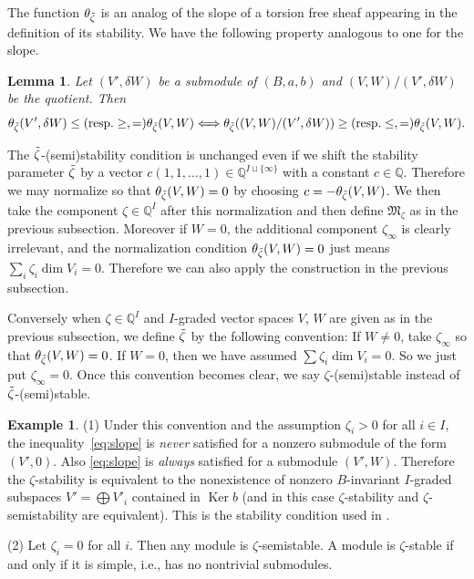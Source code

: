 \documentclass[10pt,a4paper]{amsart}
\newtheorem{Lemma}[equation]{Lemma}
\theoremstyle{definition}
\newtheorem{Example}[equation]{Example}
\numberwithin{equation}{section}
\newcommand{\Q}{{\mathbb Q}}
\newcommand{\Ker}{\operatorname{Ker}}
\newcommand{\M}{{\mathfrak M}} %
\begin{document}
The function $\theta_{\Tilde\zeta}$ is an analog of the slope of a
torsion free sheaf appearing in the def\/inition of its stability. We
have the following property analogous to one for the slope.
\begin{Lemma}\label{lem:slope}
  Let $(V',\delta W)$ be a submodule of $(B,a,b)$ and
  $(V,W)/(V',\delta W)$ be the quotient. Then
  \begin{equation*}
     \theta_{\Tilde\zeta}(V',\delta W)
     \le (\text{resp.} \ge, =)
     \theta_{\Tilde\zeta}(V,W)
     \Longleftrightarrow
     \theta_{\Tilde\zeta}((V,W)/(V',\delta W))
     \ge (\text{resp.} \le, =)
     \theta_{\Tilde\zeta}(V,W).
  \end{equation*}
\end{Lemma}


The $\Tilde\zeta$-(semi)stability condition is unchanged even if we
shift the stability parameter $\Tilde\zeta$ by a vector
$c(1,1,\dots,1)\in \Q^{I\sqcup\{\infty\}}$ with a constant $c\in \Q$.
Therefore we may normalize so that $\theta_{\Tilde\zeta}(V,W) = 0$
by choosing $c = -\theta_{\Tilde\zeta}(V,W)$.
We then take the component $\zeta\in\Q^I$ after this normalization and
then def\/ine $\M_\zeta$ as in the previous subsection.
Moreover if $W=0$, the additional component $\zeta_\infty$ is clearly
irrelevant, and the normalization condition
$\theta_{\Tilde\zeta}(V,W) = 0$ just means $\sum_i \zeta_i \dim V_i
= 0$. Therefore we can also apply the construction in the previous
subsection.

Conversely when $\zeta\in\Q^I$ and $I$-graded vector spaces $V$, $W$
are given as in the previous subsection, we def\/ine $\Tilde\zeta$ by
the following convention: If $W \neq 0$, take $\zeta_\infty$ so that
$\theta_{\Tilde\zeta}(V,W) = 0$. If $W = 0$, then we have assumed
$\sum \zeta_i \dim V_i = 0$. So we just put $\zeta_\infty = 0$.
%
Once this convention becomes clear, we say
$\zeta$-(semi)stable instead of $\Tilde\zeta$-(semi)stable.

\begin{Example}\label{ex:stndcham}
(1)
Under this convention and the assumption $\zeta_{i} > 0$ for all $i\in I$,
the inequali\-ty~\eqref{eq:slope} is {\it never\/} satisf\/ied for a
nonzero submodule of the form $(V',0)$. Also
\eqref{eq:slope} is {\it always} satisf\/ied for a submodule
$(V',W)$.
Therefore the $\zeta$-stability is equivalent to the nonexistence of
nonzero $B$-invariant $I$-graded subspaces $V' = \bigoplus V'_i$
contained in $\Ker b$
(and in this case $\zeta$-stability and $\zeta$-semistability
are equivalent). This is the stability condition used in
\cite[{3.9}]{Na-alg}.

(2) Let $\zeta_i = 0$ for all $i$. Then any module is
$\zeta$-semistable. A module is $\zeta$-stable if and only if it is
simple, i.e., has no nontrivial submodules.
\end{Example}
\end{document}
